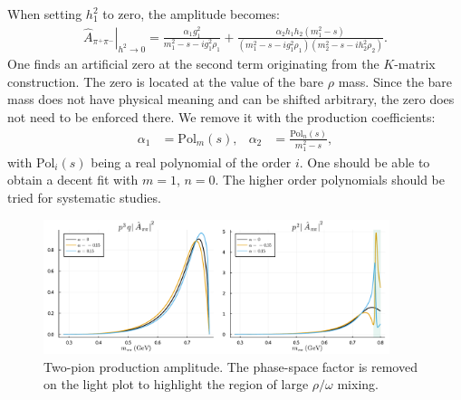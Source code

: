 \documentclass[aps,prd,superscriptaddress,onecolumn,nofootinbib,preprintnumbers,notitlepage]{revtex4-1}
\begin{document}
When setting $h_1^2$ to zero, the amplitude becomes:
\begin{align}
  \left.\hat{A}_{\pi^+\pi^-}\right|_{h^2\to 0} = \frac{\alpha_1 g_1^2}{m_1^2 - s - i g_1^2 \rho_1} + \frac{\alpha_2 h_1 h_2 (m_1^2-s)}{(m_1^2 - s - i g_1^2 \rho_1)(m_2^2 - s - i h_2^2 \rho_2)}.
\end{align}
One finds an artificial zero at the second term originating from the $K$-matrix construction.
The zero is located at the value of the bare $\rho$ mass.
Since the bare mass does not have physical meaning and can be shifted arbitrary,
the zero does not need to be enforced there.
We remove it with the production coefficients:
\begin{align} \label{eq:production.poly}
  \alpha_1 &= \text{Pol}_m(s), & \alpha_2 &= \frac{\text{Pol}_n(s)}{m_1^2-s},
\end{align}
with $\text{Pol}_i(s)$ being a real polynomial of the order $i$.
One should be able to obtain a decent fit with $m=1$, $n=0$.
The higher order polynomials should be tried for systematic studies.
\begin{figure}
  \includegraphics[width=0.9\textwidth]{X2pipi_intensity_combined.pdf}
  \caption{Two-pion production amplitude.
  The phase-space factor is removed on the light plot to highlight the region
  of large $\rho/\omega$ mixing.}
\end{figure}


\end{document}
